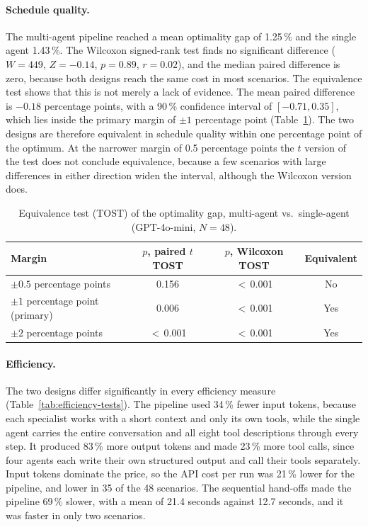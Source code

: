 \paragraph{Schedule quality.} The multi-agent pipeline reached a mean
optimality gap of 1.25\,\% and the single agent 1.43\,\%. The Wilcoxon
signed-rank test finds no significant difference ($W = 449$,
$Z = -0.14$, $p = 0.89$, $r = 0.02$), and the median paired difference
is zero, because both designs reach the same cost in most scenarios. The
equivalence test shows that this is not merely a lack of evidence. The
mean paired difference is $-0.18$ percentage points, with a 90\,\%
confidence interval of $[-0.71, 0.35]$, which lies inside the primary
margin of $\pm 1$ percentage point (Table~\ref{tab:equivalence}). The two
designs are therefore equivalent in schedule quality within one
percentage point of the optimum. At the narrower margin of 0.5
percentage points the $t$ version of the test does not conclude
equivalence, because a few scenarios with large differences in either
direction widen the interval, although the Wilcoxon version does.

\begin{table}[h!]
\caption{Equivalence test (TOST) of the optimality gap, multi-agent vs.\ single-agent (GPT-4o-mini, $N = 48$).}
\label{tab:equivalence}
\small
\begin{tabular*}{\textwidth}{@{\extracolsep{\fill}}lccc}
\toprule
Margin & $p$, paired $t$ TOST & $p$, Wilcoxon TOST & Equivalent \\
\midrule
$\pm 0.5$ percentage points & 0.156 & $<$\,0.001 & No \\
$\pm 1$ percentage point (primary) & 0.006 & $<$\,0.001 & Yes \\
$\pm 2$ percentage points & $<$\,0.001 & $<$\,0.001 & Yes \\
\bottomrule
\end{tabular*}
\end{table}

\paragraph{Efficiency.} The two designs differ significantly in every
efficiency measure (Table~\ref{tab:efficiency-tests}). The pipeline used
34\,\% fewer input tokens, because each specialist works with a short
context and only its own tools, while the single agent carries the
entire conversation and all eight tool descriptions through every step.
It produced 83\,\% more output tokens and made 23\,\% more tool calls,
since four agents each write their own structured output and call their
tools separately. Input tokens dominate the price, so the API cost per run was
21\,\% lower for the pipeline, and lower in 35 of the 48 scenarios. The
sequential hand-offs made the pipeline 69\,\% slower, with a mean of
21.4 seconds against 12.7 seconds, and it was faster in only two
scenarios.

